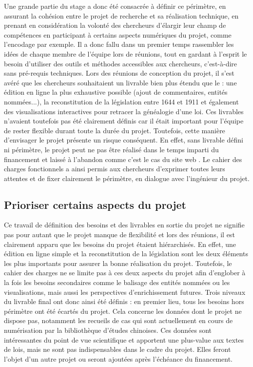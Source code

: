 Une grande partie du stage a donc été consacrée à définir ce périmètre, en assurant la cohésion entre le projet de recherche et sa réalisation technique, en prenant en considération la volonté des chercheurs d'élargir leur champ de compétences en participant à certains aspects numériques du projet, comme l'encodage par exemple. Il a donc fallu dans un premier temps rassembler les idées de chaque membre de l'équipe lors de réunions, tout en gardant à l'esprit le besoin d'utiliser des outils et méthodes accessibles aux chercheurs, c'est-à-dire sans pré-requis techniques. Lors des réunions de conception du projet, il s'est avéré que les chercheurs souhaitaient un livrable bien plus étendu que le \POC : une édition en ligne la plus exhaustive possible (ajout de commentaires, entités nommées...), la reconstitution de la législation entre 1644 et 1911 et également des visualisations interactives pour retracer la généalogie d'une loi. Ces livrables n'avaient toutefois pas été clairement définis car il était important pour l'équipe de rester flexible durant toute la durée du projet. Toutefois, cette manière d'envisager le projet présente un risque conséquent. En effet, sans livrable défini ni périmètre, le projet peut ne pas être réalisé dans le temps imparti du financement et laissé à l'abandon comme c'est le cas du site web \LSC. Le cahier des charges fonctionnels a ainsi permis aux chercheurs d'exprimer toutes leurs attentes et de fixer clairement le périmètre, en dialogue avec l'ingénieur du projet. 

\subsection{Prioriser certains aspects du projet}

Ce travail de définition des besoins et des livrables en sortie du projet ne signifie pas pour autant que le projet manque de flexibilité et lors des réunions, il est clairement apparu que les besoins du projet étaient hiérarchisés. En effet, une édition en ligne simple et la reconstitution de la législation sont les deux éléments les plus importants pour assurer la bonne réalisation du projet. Toutefois, le cahier des charges ne se limite pas à ces deux aspects du projet afin d'englober à la fois les besoins secondaires comme le balisage des entités nommées ou les visualisations, mais aussi les perspectives d'enrichissement futures. Trois niveaux du livrable final ont donc ainsi été définis : en premier lieu, tous les besoins hors périmètre ont été écartés du projet. Cela concerne les données dont le projet ne dispose pas, notamment les recueils de cas qui sont actuellement en cours de numérisation par la bibliothèque d'études chinoises. Ces données sont intéressantes du point de vue scientifique et apportent une plus-value aux textes de lois, mais ne sont pas indispensables dans le cadre du projet. Elles feront l'objet d'un autre projet ou seront ajoutées après l'échéance du financement. 

